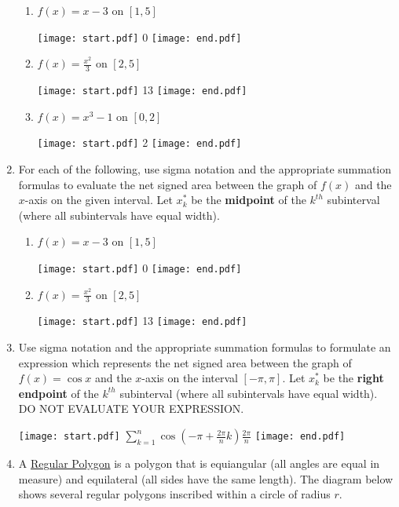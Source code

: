 \documentclass[12pt]{article}
\begin{document}
\begin{enumerate}
\begin{enumerate}
\item $f(x)=x-3$ on $[1,5]$

\texttt{[image: start.pdf]}
{{0}}
\texttt{[image: end.pdf]}


\item $f(x)=\frac{x^2}{3}$ on $[2,5]$

\texttt{[image: start.pdf]}
{{13}}
\texttt{[image: end.pdf]}


\item $f(x)=x^3-1$ on $[0,2]$

\texttt{[image: start.pdf]}
{{2}}
\texttt{[image: end.pdf]}


\end{enumerate}

\item For each of the following, use sigma notation and the appropriate summation formulas to evaluate the net signed area between the graph of $f(x)$ and the $x$-axis on the given interval.  Let $x_k^*$ be the {\bf midpoint} of the $k^{th}$ subinterval (where all subintervals have equal width).

\begin{enumerate}

\item $f(x)=x-3$ on $[1,5]$

\texttt{[image: start.pdf]}
{{0}}
\texttt{[image: end.pdf]}


\item $f(x)=\frac{x^2}{3}$ on $[2,5]$

\texttt{[image: start.pdf]}
{{13}}
\texttt{[image: end.pdf]}


\end{enumerate}

\item Use sigma notation and the appropriate summation formulas to formulate an expression which represents the net signed area between the graph of $f(x)=\cos{x}$ and the $x$-axis on the interval $[-\pi,\pi]$.  Let $x_k^*$ be the {\bf right endpoint} of the $k^{th}$ subinterval (where all subintervals have equal width).  DO NOT EVALUATE YOUR EXPRESSION.

\texttt{[image: start.pdf]}
{{$\sum_{k=1}^n\cos{\left(-\pi+\frac{2\pi}{n}k\right)}\frac{2\pi}{n}$}}
\texttt{[image: end.pdf]}


\medskip

\item A \underline{Regular Polygon} is a polygon that is equiangular (all angles are equal in measure) and equilateral (all sides have the same length).  The diagram below shows several regular polygons inscribed within a circle of radius $r$.


\end{enumerate}
\end{document}
